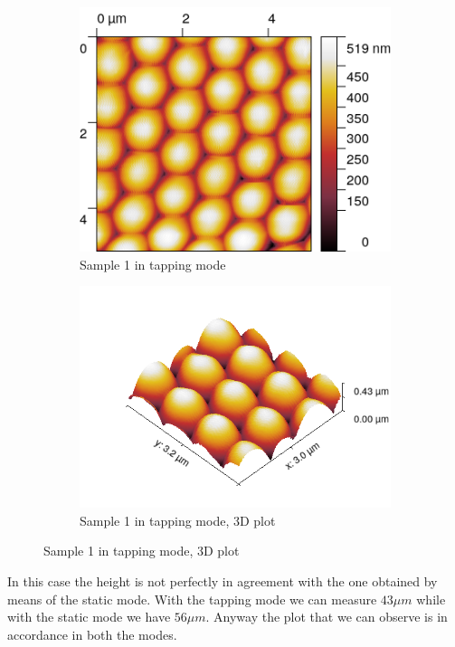 \documentclass[11pt,a4paper]{article}
\begin{document}
\begin{figure}[H]
\centering
\begin{subfigure}[b]{0.45\textwidth}
\includegraphics[width=\textwidth]{tm_sample1}
\caption{Sample 1 in tapping mode}
\label{fig:}
\end{subfigure}
\begin{subfigure}[b]{0.45\textwidth}
\includegraphics[width=\textwidth]{tm_sample1_3D}
\caption{Sample 1 in tapping mode, 3D plot}
\label{fig:}
\end{subfigure}
\end{figure}

In this case the height is not perfectly in agreement with the one obtained by means of the static mode. With the tapping mode we can measure $43\mu m$ while with the static mode we have $56\mu m$. Anyway the plot that we can observe is in accordance in both the modes.
\end{document}
